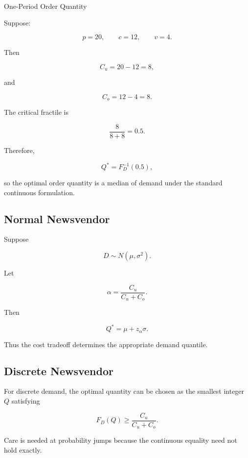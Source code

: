 \begin{workedexamplebox}{One-Period Order Quantity}

Suppose:

\[
p=20,
\qquad
c=12,
\qquad
v=4.
\]

Then

\[
C_u
=
20-12
=
8,
\]

and

\[
C_o
=
12-4
=
8.
\]

The critical fractile is

\[
\frac{
8
}{
8+8
}
=
0.5.
\]

Therefore,

\begin{answerbox}
\[
\boxed{
Q^*
=
F_D^{-1}(0.5),
}
\]

so the optimal order quantity is a median of demand under the standard
continuous formulation.
\end{answerbox}

\end{workedexamplebox}

\subsection{Normal Newsvendor}
\label{subsec:normal-newsvendor}

Suppose

\[
D
\sim
N(\mu,\sigma^2).
\]

Let

\[
\alpha
=
\frac{
C_u
}{
C_u+C_o
}.
\]

Then

\[
\boxed{
Q^*
=
\mu
+
z_\alpha\sigma.
}
\]

Thus the cost tradeoff determines the appropriate demand quantile.

\subsection{Discrete Newsvendor}
\label{subsec:discrete-newsvendor}

For discrete demand, the optimal quantity can be chosen as the smallest
integer \(Q\) satisfying

\[
\boxed{
F_D(Q)
\geq
\frac{
C_u
}{
C_u+C_o
}.
}
\]

Care is needed at probability jumps because the continuous equality need
not hold exactly.


